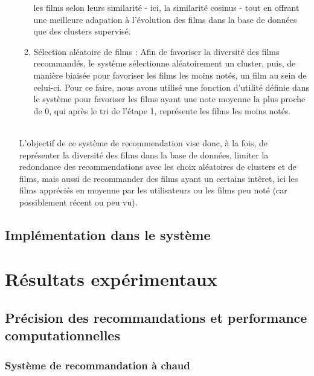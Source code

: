 \documentclass{article}
\begin{document}
\begin{itemize}
\begin{enumerate}
        les films selon leurs similarité - ici, la similarité cosinus - tout en offrant une meilleure adapation à l'évolution des films dans la base de données que des clusters supervisé.
        \item Sélection aléatoire de films : Afin de favoriser la diversité des films recommandés, le système sélectionne aléatoirement un cluster, puis, de manière biaisée pour favoriser les films les moins notés, un film au sein de celui-ci.
        Pour ce faire, nous avons utilisé une fonction d'utilité définie dans le système pour favoriser les films ayant une note moyenne la plus proche de 0, qui après le tri de l'étape 1, représente les films les moins notés.
    \end{enumerate}
    $ $\\
    L'objectif de ce système de recommendation vise donc, à la fois, de représenter la diversité des films dans la base de données, limiter la redondance des recommendations avec les choix aléatoires de clusters et de films, mais aussi de recommander des films 
    ayant un certains intêret, ici les films appréciés en moyenne par les utilisateurs ou les films peu noté (car possiblement récent ou peu vu).\\

\end{itemize}


\subsection{Implémentation dans le système}
    \section{Résultats expérimentaux}
    \subsection{Précision des recommandations et performance computationnelles}
    \subsubsection{Système de recommandation à chaud}
    $ $\\
    \\
    \\
    \\
    \\
    \\
    \\
    \\
\end{document}
